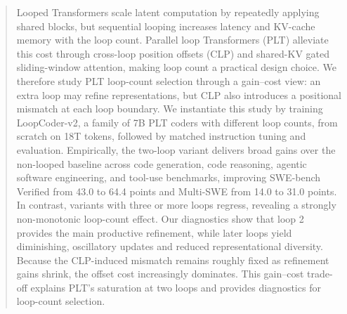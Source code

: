 \begin{abstract}
Looped Transformers scale latent computation by repeatedly applying shared blocks, but sequential looping increases latency and KV-cache memory with the loop count. Parallel loop Transformers (PLT) alleviate this cost through cross-loop position offsets (CLP) and shared-KV gated sliding-window attention, making loop count a practical design choice. We therefore study PLT loop-count selection through a gain--cost view: an extra loop may refine representations, but CLP also introduces a positional mismatch at each loop boundary. We instantiate this study by training LoopCoder-v2, a family of 7B PLT coders with different loop counts, from scratch on 18T tokens, followed by matched instruction tuning and evaluation. Empirically, the two-loop variant delivers broad gains over the non-looped baseline across code generation, code reasoning, agentic software engineering, and tool-use benchmarks, improving SWE-bench Verified from 43.0 to 64.4 points and Multi-SWE from 14.0 to 31.0 points. In contrast, variants with three or more loops regress, revealing a strongly non-monotonic loop-count effect. Our diagnostics show that loop 2 provides the main productive refinement, while later loops yield diminishing, oscillatory updates and reduced representational diversity. Because the CLP-induced mismatch remains roughly fixed as refinement gains shrink, the offset cost increasingly dominates. This gain--cost trade-off explains PLT's saturation at two loops and provides diagnostics for loop-count selection.
\end{abstract}
